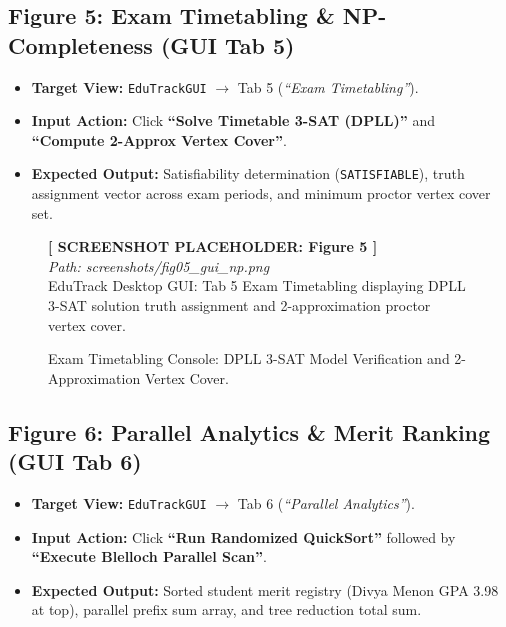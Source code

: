 \subsection{Figure 5: Exam Timetabling \& NP-Completeness (GUI Tab 5)}
\begin{itemize}
    \item \textbf{Target View:} \texttt{EduTrackGUI} $\to$ Tab 5 (\textit{``Exam Timetabling''}).
    \item \textbf{Input Action:} Click \textbf{``Solve Timetable 3-SAT (DPLL)''} and \textbf{``Compute 2-Approx Vertex Cover''}.
    \item \textbf{Expected Output:} Satisfiability determination (\texttt{SATISFIABLE}), truth assignment vector across exam periods, and minimum proctor vertex cover set.
\end{itemize}

\begin{figure}[H]
\centering
\begin{tcolorbox}[colback=white,colframe=codegray,width=0.92\textwidth,halign=center]
\vspace{0.8cm}
\textbf{[ SCREENSHOT PLACEHOLDER: Figure 5 ]}\\
\textit{Path: screenshots/fig05_gui_np.png}\\
\small EduTrack Desktop GUI: Tab 5 Exam Timetabling displaying DPLL 3-SAT solution truth assignment and 2-approximation proctor vertex cover.
\vspace{0.8cm}
\end{tcolorbox}
\caption{Exam Timetabling Console: DPLL 3-SAT Model Verification and 2-Approximation Vertex Cover.}
\label{fig:ss_np}
\end{figure}

\subsection{Figure 6: Parallel Analytics \& Merit Ranking (GUI Tab 6)}
\begin{itemize}
    \item \textbf{Target View:} \texttt{EduTrackGUI} $\to$ Tab 6 (\textit{``Parallel Analytics''}).
    \item \textbf{Input Action:} Click \textbf{``Run Randomized QuickSort''} followed by \textbf{``Execute Blelloch Parallel Scan''}.
    \item \textbf{Expected Output:} Sorted student merit registry (Divya Menon GPA 3.98 at top), parallel prefix sum array, and tree reduction total sum.
\end{itemize}

